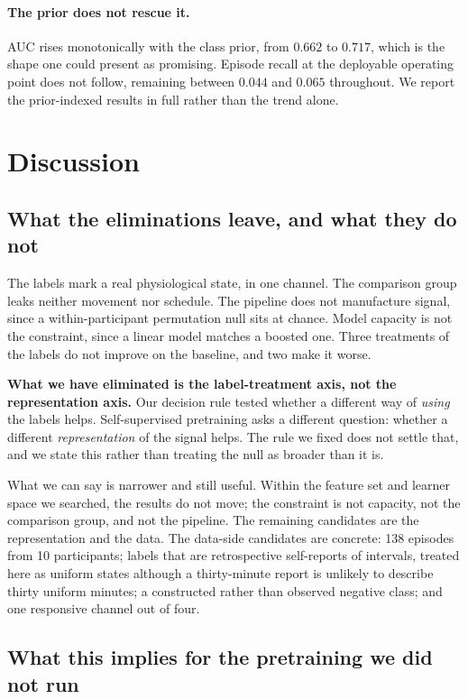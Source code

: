 \documentclass{article}
\begin{document}
\paragraph{The prior does not rescue it.} AUC rises monotonically with the
class prior, from $0.662$ to $0.717$, which is the shape one could present as
promising. Episode recall at the deployable operating point does not follow,
remaining between $0.044$ and $0.065$ throughout. We report the prior-indexed
results in full rather than the trend alone.

\section{Discussion}

\subsection{What the eliminations leave, and what they do not}

The labels mark a real physiological state, in one channel. The comparison
group leaks neither movement nor schedule. The pipeline does not manufacture
signal, since a within-participant permutation null sits at chance. Model
capacity is not the constraint, since a linear model matches a boosted one.
Three treatments of the labels do not improve on the baseline, and two make it
worse.

\textbf{What we have eliminated is the label-treatment axis, not the
representation axis.} Our decision rule tested whether a different way of
\emph{using} the labels helps. Self-supervised pretraining asks a different
question: whether a different \emph{representation} of the signal helps. The
rule we fixed does not settle that, and we state this rather than treating the
null as broader than it is.

What we can say is narrower and still useful. Within the feature set and
learner space we searched, the results do not move; the constraint is not
capacity, not the comparison group, and not the pipeline. The remaining
candidates are the representation and the data. The data-side candidates are
concrete: 138 episodes from 10 participants; labels that are retrospective
self-reports of intervals, treated here as uniform states although a
thirty-minute report is unlikely to describe thirty uniform minutes; a
constructed rather than observed negative class; and one responsive channel out
of four.

\subsection{What this implies for the pretraining we did not run}
\end{document}
